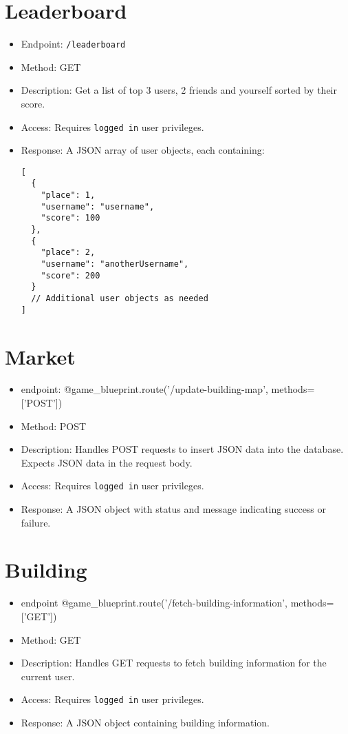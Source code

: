 \documentclass[12pt]{article}
\begin{document}
\section{Leaderboard}
\begin{itemize}
    \item Endpoint: \texttt{/leaderboard}
    \item Method: GET
    \item Description: Get a list of top 3 users, 2 friends and yourself sorted by their score.
    \item Access: Requires \texttt{logged in} user privileges.
    \item Response: A JSON array of user objects, each containing:
    \begin{verbatim}
[
  {
    "place": 1,
    "username": "username",
    "score": 100
  },
  {
    "place": 2,
    "username": "anotherUsername",
    "score": 200
  }
  // Additional user objects as needed
]
    \end{verbatim}
\end{itemize}


\section{Market}
\begin{itemize}
    \item endpoint: {@game\_blueprint.route('/update-building-map', methods=['POST'])}
        \item{Method:} POST
        \item{Description:} Handles POST requests to insert JSON data into the database. Expects JSON data in the request body.
        \item {Access:} Requires \texttt{logged in} user privileges.
        \item {Response:} A JSON object with status and message indicating success or failure.
    \end{itemize}

\section{Building}
\begin{itemize}
    \item endpoint {@game\_blueprint.route('/fetch-building-information', methods=['GET'])}
        \item {Method:} GET
        \item {Description:} Handles GET requests to fetch building information for the current user.
        \item {Access:} Requires \texttt{logged in} user privileges.
        \item {Response:} A JSON object containing building information.
    \end{itemize}
\end{document}
